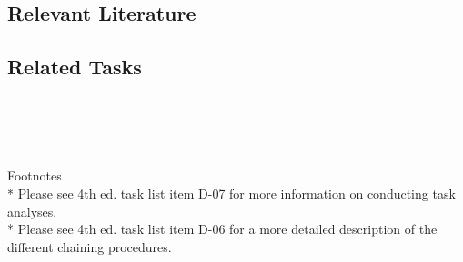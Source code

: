 \subsection{Relevant Literature}
\begin{refsection}
\nocite{cooper2007applied,
        kazdin2012behavior,
        miltenberger2008behavior,
        test1990teaching}
\printbibliography[heading=none]
\end{refsection}
%
\subsection{Related Tasks}
\fourdSix{}\\
\fourdSeven{}\\
\fourjTwo{}\\
\fourjFive{}\\
%
Footnotes\\
* Please see 4th ed. task list item D-07 for more information on conducting task analyses.\\
* Please see 4th ed. task list item D-06 for a more detailed description of the different chaining procedures.\\

